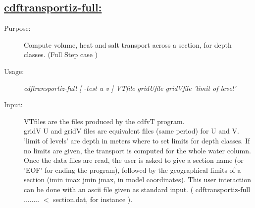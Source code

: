 \documentclass[a4paper,11pt]{article}
\begin{document}
\subsection*{\underline{cdftransportiz-full:}}
\begin{description}
\item[Purpose:] Compute volume, heat and salt transport across a section, for depth classes. (Full Step case )
\item[Usage:] {\em cdftransportiz-full [ -test u v ] VTfile gridUfile gridVfile  'limit of level' }
\item[Input:] VTfiles are the files produced by the cdfvT program. \\
gridV U and gridV files are equivalent files (same period) for U and V. \\
'limit of levels' are depth in meters where to set limits for depth classes. If no limits are given, the transport is
computed for the whole water column. \\
Once the data  files are read, the user is asked to give a section name (or 'EOF' for ending the program), followed
by the geographical limits of a section (imin imax jmin jmax, in model coordinates). This user interaction can be done
with an ascii file given as standard input. ( cdftransportiz-full ........ $<$ section.dat, for instance ).


\end{description}
\end{document}
